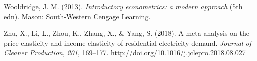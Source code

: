 \documentclass[12pt,twoside]{reedthesis}
\newlength{\cslhangindent}
\newenvironment{CSLReferences}[2] %
 {%
  \setlength{\parindent}{0pt}
  \ifodd #1 \everypar{\setlength{\hangindent}{\cslhangindent}}\ignorespaces\fi
  \ifnum #2 > 0
  \setlength{\parskip}{#2\baselineskip}
  \fi
 }%
 {}
\begin{document}
\begin{CSLReferences}{1}{0}
\leavevmode{}%
Wooldridge, J. M. (2013). \emph{Introductory econometrics: a modern approach} (5th edn). Mason: South-Western Cengage Learning.

\leavevmode{}%
Zhu, X., Li, L., Zhou, K., Zhang, X., \& Yang, S. (2018). A meta-analysis on the price elasticity and income elasticity of residential electricity demand. \emph{Journal of Cleaner Production}, \emph{201}, 169--177. http://doi.org/\href{https://doi.org/10.1016/j.jclepro.2018.08.027}{10.1016/j.jclepro.2018.08.027}

\end{CSLReferences}

\end{document}
